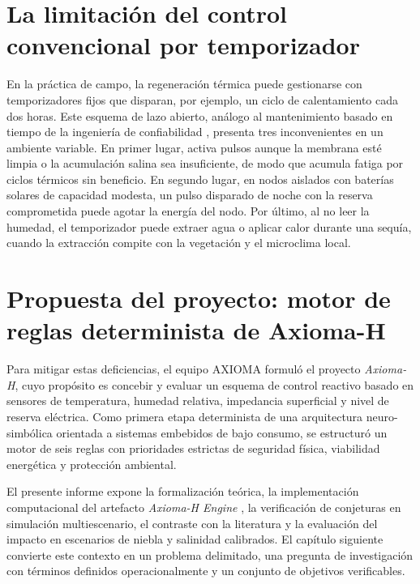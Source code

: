 \section{La limitaci\'on del control convencional por temporizador}
En la pr\'actica de campo, la regeneraci\'on t\'ermica puede gestionarse con temporizadores fijos que disparan, por ejemplo, un ciclo de calentamiento cada dos horas. Este esquema de lazo abierto, an\'alogo al mantenimiento basado en tiempo de la ingenier\'ia de confiabilidad \parencite{jardine2006review}, presenta tres inconvenientes en un ambiente variable. En primer lugar, activa pulsos aunque la membrana est\'e limpia o la acumulaci\'on salina sea insuficiente, de modo que acumula fatiga por ciclos t\'ermicos sin beneficio. En segundo lugar, en nodos aislados con bater\'ias solares de capacidad modesta, un pulso disparado de noche con la reserva comprometida puede agotar la energ\'ia del nodo. Por \'ultimo, al no leer la humedad, el temporizador puede extraer agua o aplicar calor durante una sequ\'ia, cuando la extracci\'on compite con la vegetaci\'on y el microclima local.

\section{Propuesta del proyecto: motor de reglas determinista de Axioma-H}
Para mitigar estas deficiencias, el equipo AXIOMA formul\'o el proyecto \emph{Axioma-H}, cuyo prop\'osito es concebir y evaluar un esquema de control reactivo basado en sensores de temperatura, humedad relativa, impedancia superficial y nivel de reserva el\'ectrica. Como primera etapa determinista de una arquitectura neuro-simb\'olica orientada a sistemas embebidos de bajo consumo, se estructur\'o un motor de seis reglas con prioridades estrictas de seguridad f\'isica, viabilidad energ\'etica y protecci\'on ambiental.

El presente informe expone la formalizaci\'on te\'orica, la implementaci\'on computacional del artefacto \emph{Axioma-H Engine} \parencite[v.~0.5.0]{axioma2026engine}, la verificaci\'on de conjeturas en simulaci\'on multiescenario, el contraste con la literatura y la evaluaci\'on del impacto en escenarios de niebla y salinidad calibrados. El cap\'itulo siguiente convierte este contexto en un problema delimitado, una pregunta de investigaci\'on con t\'erminos definidos operacionalmente y un conjunto de objetivos verificables.
